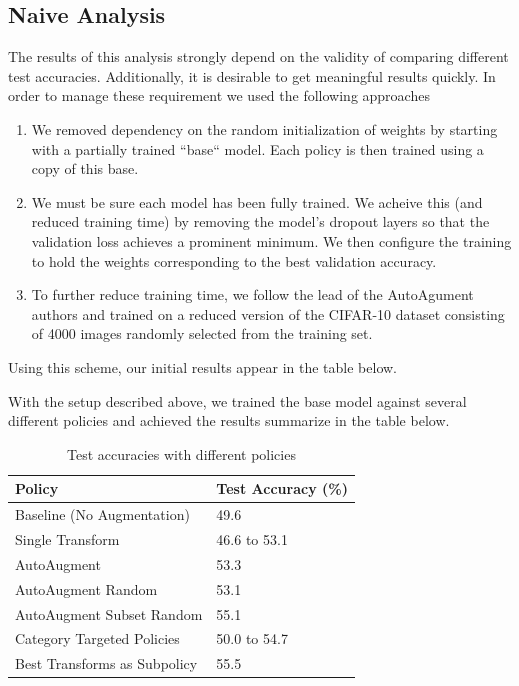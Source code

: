 \documentclass[10pt,twocolumn,letterpaper]{article}
\begin{document}
\subsection{Naive Analysis}
The results of this analysis strongly depend on the validity of comparing different test accuracies. Additionally, it is desirable to get meaningful results quickly. In order to manage these requirement we used the following approaches

\begin{enumerate}
\item We removed dependency on the random initialization of weights by starting with a partially trained ``base`` model. Each policy is then trained using a copy of this base.
\item We must be sure each model has been fully trained. We acheive this (and reduced training time) by removing the model's dropout layers so that the validation loss achieves a prominent minimum. We then configure the training to hold the weights corresponding to the best validation accuracy.
\item To further reduce training time, we follow the lead of the AutoAgument authors and trained on a reduced version of the CIFAR-10 dataset consisting of 4000 images randomly selected from the training set.
\end{enumerate}

Using this scheme, our initial results appear in the table below.



With the setup described above, we trained the base model against several different policies and achieved the results summarize in the table below.

		\begin{table}[h]
			\begin{tabular}{l|l}
				\hline
				Policy  						&Test Accuracy (\%)   \\ \hline
				Baseline (No Augmentation)  	&49.6 \\
				Single Transform				&46.6 to 53.1 \\
				AutoAugment 					&53.3 \\ 
				AutoAugment Random				&53.1 \\	
				AutoAugment Subset Random 		&55.1 \\
				Category Targeted Policies   	&50.0 to 54.7 \\
				Best Transforms as Subpolicy 	&55.5
			\end{tabular}
			\caption{Test accuracies with different policies}
		\end{table}
	
\end{document}
